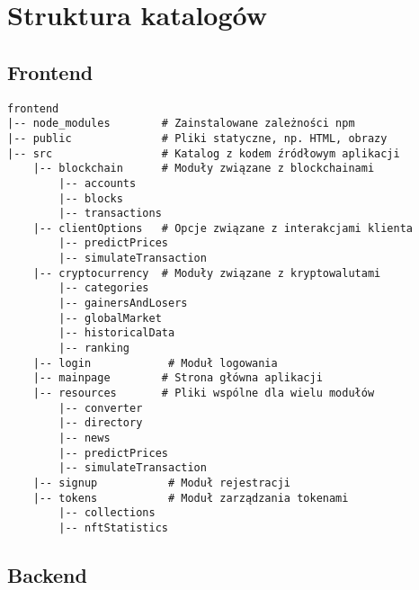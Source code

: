 \section{Struktura katalogów}

\subsection{Frontend}

\begin{verbatim}
frontend
|-- node_modules        # Zainstalowane zależności npm
|-- public              # Pliki statyczne, np. HTML, obrazy
|-- src                 # Katalog z kodem źródłowym aplikacji
    |-- blockchain      # Moduły związane z blockchainami
        |-- accounts
        |-- blocks
        |-- transactions
    |-- clientOptions   # Opcje związane z interakcjami klienta
        |-- predictPrices
        |-- simulateTransaction
    |-- cryptocurrency  # Moduły związane z kryptowalutami
        |-- categories
        |-- gainersAndLosers
        |-- globalMarket
        |-- historicalData
        |-- ranking
    |-- login            # Moduł logowania
    |-- mainpage        # Strona główna aplikacji
    |-- resources       # Pliki wspólne dla wielu modułów
        |-- converter
        |-- directory
        |-- news
        |-- predictPrices
        |-- simulateTransaction
    |-- signup           # Moduł rejestracji
    |-- tokens           # Moduł zarządzania tokenami
        |-- collections
        |-- nftStatistics
\end{verbatim}

\subsection{Backend}

